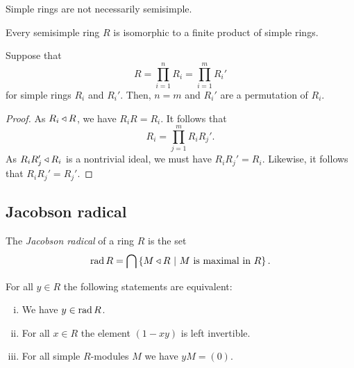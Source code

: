 \begin{opomba}
Simple rings are not necessarily semisimple.
\end{opomba}

\begin{opomba}
Every semisimple ring $R$ is isomorphic to a finite product of
simple rings.
\end{opomba}

\begin{trditev}
Suppose that
\[
R = \prod_{i=1}^n R_i = \prod_{i=1}^m R_i'
\]
for simple rings $R_i$ and $R_i'$. Then, $n = m$ and $R_i'$ are a
permutation of $R_i$.
\end{trditev}

\begin{proof}
As $R_i \triangleleft R$, we have $R_i R = R_i$. It follows that
\[
R_i = \prod_{j=1}^m R_i R_j'.
\]
As $R_i R_j' \triangleleft R_i$ is a nontrivial ideal, we must have
$R_i R_j' = R_i$. Likewise, it follows that $R_i R_j' = R_j'$.
\end{proof}

\newpage

\subsection{Jacobson radical}

\begin{definicija}
The \emph{Jacobson radical} of a ring $R$
is the set
\[
\operatorname{rad} R = \bigcap \left\{M \triangleleft R~\middle\vert~\text{$M$ is maximal in $R$}\right\}.
\]
\end{definicija}

\begin{lema}
\label{fin_dim_alg:lm:jac_rad}
For all $y \in R$ the following statements are equivalent:

\begin{enumerate}[i)]
\item We have $y \in \operatorname{rad} R$.
\item For all $x \in R$ the element $(1-xy)$ is left invertible.
\item For all simple $R$-modules $M$ we have $yM = (0)$.
\end{enumerate}
\end{lema}

